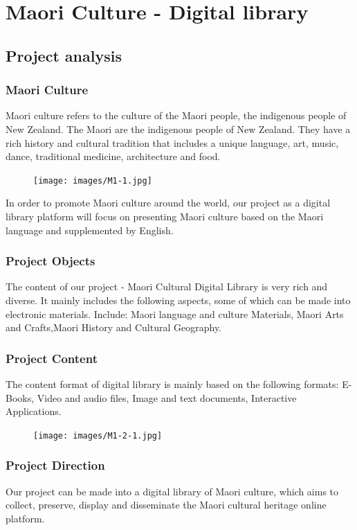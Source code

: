 \chapter{Maori Culture - Digital library}

\section{Project analysis}
\subsection{Maori Culture}
Maori culture refers to the culture of the Maori people, the indigenous people of New Zealand. The Maori are the indigenous people of New Zealand. They have a rich history and cultural tradition that includes a unique language, art, music, dance, traditional medicine, architecture and food.

\begin{figure}[htbp]
  \centerline{\texttt{[image: images/M1-1.jpg]}}
\end{figure}

In order to promote Maori culture around the world, our project as a digital library platform will focus on presenting Maori culture based on the Maori language and supplemented by English.

\subsection{Project Objects}
The content of our project - Maori Cultural Digital Library is very rich and diverse. It mainly includes the following aspects, some of which can be made into electronic materials. Include: Maori language and culture Materials, Maori Arts and Crafts,Maori History and Cultural Geography.

\subsection{Project Content}
The content format of digital library is mainly based on the following formats:
E-Books, Video and audio files, Image and text documents, Interactive Applications.

\begin{figure}[htbp]
  \centerline{\texttt{[image: images/M1-2-1.jpg]}}
\end{figure}

\subsection{Project Direction}
Our project can be made into a digital library of Maori culture, which aims to collect, preserve, display and disseminate the Maori cultural heritage online platform.

